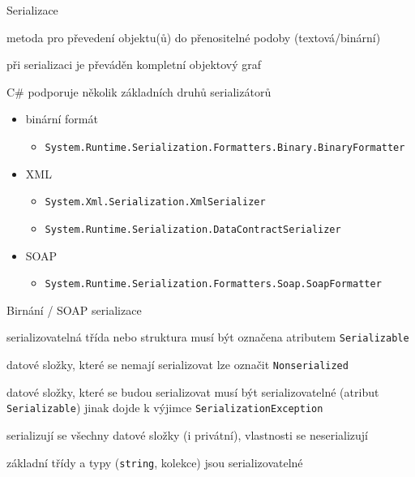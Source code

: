 \begin{frame}[fragile]
\begin{bitemize}{Serializace}
\item metoda pro převedení objektu(ů) do přenositelné podoby (textová/binární)
\item při serializaci je převáděn kompletní objektový graf
\item C\# podporuje několik základních druhů serializátorů
\begin{itemize}
\item binární formát 
\begin{itemize}
\item \lstinline|System.Runtime.Serialization.Formatters.Binary.BinaryFormatter|
\end{itemize}

\item XML
\begin{itemize}
\item \lstinline|System.Xml.Serialization.XmlSerializer|
\item \lstinline|System.Runtime.Serialization.DataContractSerializer|
\end{itemize}

\item SOAP
\begin{itemize}
\item \lstinline|System.Runtime.Serialization.Formatters.Soap.SoapFormatter|
\end{itemize}

\end{itemize}
\end{bitemize}
\end{frame}




\begin{frame}[fragile]
\begin{bitemize}{Birnání / SOAP serializace}
\item serializovatelná třída nebo struktura musí být označena atributem \lstinline|Serializable|
\item datové složky, které se nemají serializovat lze označit \lstinline|Nonserialized|
\item datové složky, které se budou serializovat musí být serializovatelné (atribut \lstinline|Serializable|) jinak dojde k výjimce \lstinline|SerializationException|
\item serializují se všechny datové složky (i privátní), vlastnosti se neserializují
\item základní třídy a typy (\lstinline|string|, kolekce) jsou serializovatelné
\end{bitemize}
\end{frame}



